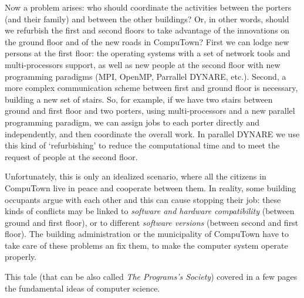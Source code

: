 \documentclass[12pt,a4paper,pdftex]{article}
\begin{document}
Now a problem arises: who should coordinate the activities between the porters (and their family) and between the other buildings? Or, in other words, should we refurbish the first and second floors to take advantage of the innovations on the ground floor and of the new roads in CompuTown?
First we can lodge new persons at the first floor: the operating systems with a set of network tools and multi-processors support, as well as new people at the second floor with new programming paradigms (MPI, OpenMP, Parrallel DYNARE, etc.). Second, a more complex communication scheme between first and ground floor is necessary, building a new set of stairs. So, for example, if we have two stairs between ground and first floor and two porters, using multi-processors and a new parallel programming paradigm, we can assign jobs to each porter directly and independently, and then coordinate the overall work. In parallel DYNARE we use this kind of `refurbishing' to reduce the computational time and to meet the request of people at the second floor.

Unfortunately, this is only an idealized  scenario, where all the citizens in CompuTown live in peace and cooperate between them. In reality, some building occupants argue with each other and this can cause stopping their job: these kinds of conflicts may be linked to \emph{software and hardware compatibility} (between ground and first floor), or to different \emph{software versions} (between second and first floor). The  building administration or the municipality of CompuTown have to take care of these problems an fix them, to make the computer system operate properly.

This tale (that can be also called \emph{The Programs's Society}) covered in a few pages the fundamental ideas of computer science.
\end{document}
